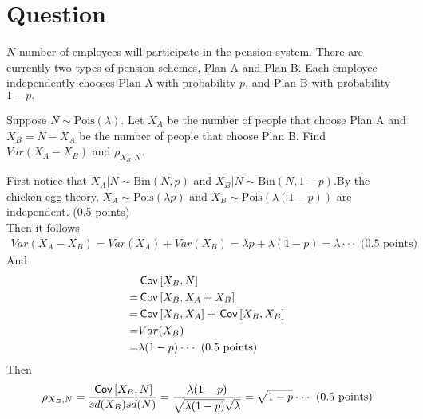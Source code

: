 \section{Question}
$N$ number of employees will participate in the pension system. There are currently two types of pension schemes, Plan A and Plan B. Each employee independently chooses Plan A with probability $p$, and Plan B with probability $1-p.$
\begin{exercise}[2]
 Suppose $N\sim\text{Pois}(\lambda).$ Let $X_A$ be the number of people that choose Plan A and $X_B=N-X_A$ be the number of people that choose Plan B. Find $Var(X_A-X_B)$ and $\rho_{X_B,N}.$

\begin{solution}
First notice that $X_A|N \sim \text{Bin}(N, p)$ and $X_B |N \sim \text{Bin}(N, 1-p)$.By the chicken-egg theory, $X_A\sim\text{Pois}(\lambda p)$ and $X_B \sim \text{Pois}(\lambda (1-p))$ are independent. (0.5 points) \\
Then it follows
\begin{align*}
    Var(X_A-X_B)=Var(X_A)+Var(X_B)=\lambda p+\lambda(1-p)=\lambda  \cdot \cdot \cdot \text{ (0.5 points)}
\end{align*}
And \begin{align*}
    &\,\mathsf{Cov}\left[X_B,N\right]\\
    =&\,\mathsf{Cov}\left[X_B,X_A+X_B\right]\\
    =&\,\mathsf{Cov}\left[X_B,X_A\right]+\,\mathsf{Cov}\left[X_B,X_B\right]\\
    =&Var(X_B)\\
    =&\lambda (1-p)  \cdot \cdot \cdot \text{ (0.5 points)}\\
\end{align*}
Then $$  \rho_{X_B,N}
    =\frac{\,\mathsf{Cov}\left[X_B,N\right]}{sd(X_B)sd(N)}
    =\frac{\lambda (1-p)}{\sqrt{\lambda (1-p)}\sqrt{\lambda}}
    =\sqrt{1-p}\cdot \cdot \cdot \text{ (0.5 points)}$$
\end{solution}
\end{exercise}

